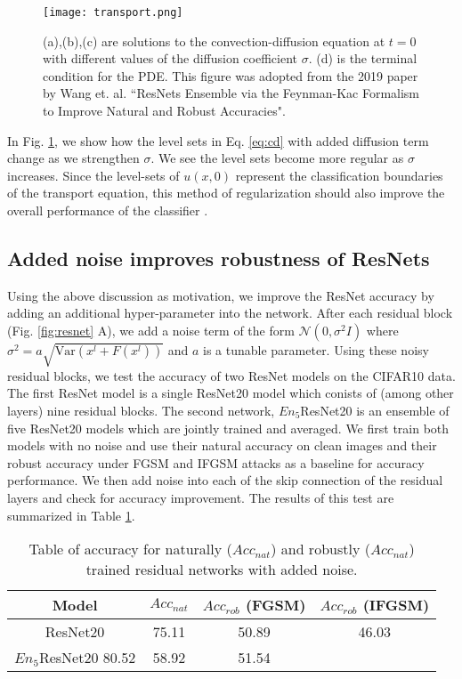 \documentclass[12pt]{article}
\begin{document}
\begin{figure}
  \centering
  \texttt{[image: transport.png]}
  \caption{(a),(b),(c) are solutions to the convection-diffusion equation at $t=0$ with different values of the diffusion coefficient $\sigma$. (d) is the terminal condition for the PDE. This figure was adopted from the 2019 paper by Wang et. al. ``ResNets Ensemble via the Feynman-Kac Formalism to Improve Natural and Robust Accuracies"\cite{res}.}
  \label{fig:transport}
\end{figure}
In Fig. \ref{fig:transport}, we show how the level sets in Eq. \ref{eq:cd} with added diffusion term change as we strengthen $\sigma$. We see the level sets become more regular as $\sigma$ increases. Since the level-sets of $u(x,0)$ represent the classification boundaries of the transport equation, this method of regularization should also improve the overall performance of the classifier \cite{res}.
\subsection{Added noise improves robustness of ResNets}
Using the above discussion as motivation, we improve the ResNet accuracy by adding an additional hyper-parameter into the network. After each residual block (Fig. \ref{fig:resnet} A), we add a noise term of the form $\mathcal{N}(0,\sigma^2 I)$ where $\sigma^2 = a\sqrt{\text{Var}(x^l + F(x^l))}$ and $a$ is a tunable parameter. Using these noisy residual blocks, we test the accuracy of two ResNet models on the CIFAR10 data. The first ResNet model is a single ResNet20 model which conists of (among other layers) nine residual blocks. The second network, $En_5$ResNet20 is an ensemble of five ResNet20 models which are jointly trained and averaged. We first train both models with no noise and use their natural accuracy on clean images and their robust accuracy under FGSM and IFGSM attacks as a baseline for accuracy performance. We then add noise into each of the skip connection of the residual layers and check for accuracy improvement. The results of this test are summarized in Table \ref{tab:enres}.
\begin{table}
  \centering
\begin{tabular}{|c|c|c|c|}
  \hline
                Model    & $Acc_{nat}$ & $Acc_{rob}$ (FGSM) &  $Acc_{rob}$ (IFGSM) \\
                      \hline
ResNet20 & 75.11  & 50.89 & 46.03   \\
  \hline
$En_5$ResNet20  80.52  & 58.92  & 51.54    \\
  \hline
\end{tabular}
\caption{Table of accuracy for naturally ($Acc_{nat}$) and robustly ($Acc_{nat}$) trained residual networks with added noise.}
\label{tab:enres}
\end{table}
\end{document}
